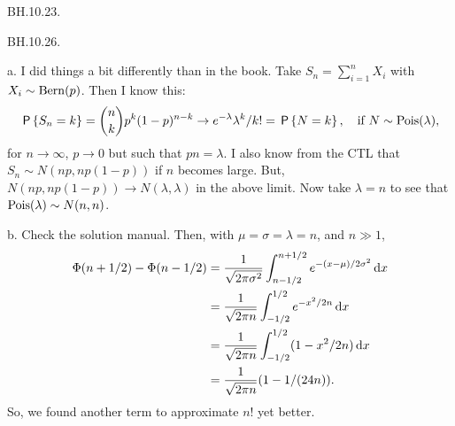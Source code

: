 \begin{exercise}
BH.10.23.
\end{exercise}

\begin{exercise}
BH.10.26.
\begin{solution}
a.
I did things a bit differently than in the book. Take $S_n=\sum_{i=1}^n X_i$ with $X_i\sim\mathrm{Bern}(p)$. Then I know this:
\begin{align*}
\,\mathsf{P}\left\{S_n=k\right\} = {n \choose k} p^k(1-p)^{n-k} \to e^{-\lambda} \lambda^k/k! = \,\mathsf{P}\left\{N=k\right\}, \quad\text{if } N\sim\mathrm{Pois}(\lambda),
\end{align*}
for $n\to \infty$, $p\to0$ but such that $p n = \lambda$.
I also know from the CTL that $S_n\sim N(n p, n p(1-p))$ if $n$ becomes large.
But, $N(n p, n p(1-p)) \to N(\lambda, \lambda)$ in the above limit.
Now take $\lambda=n$ to see that $\mathrm{Pois}(\lambda) \sim N(n,n)$.

b.
Check the solution manual. Then, with $\mu=\sigma=\lambda=n$, and $n\gg 1$,
\begin{align*}
\Phi(n+1/2) - \Phi(n-1/2)
&= \frac 1 {\sqrt{2\pi \sigma^{2}}}\int_{n-1/2}^{n+1/2} e^{-(x-\mu)/2\sigma^{2}} \,\textrm{d}x\\
&= \frac 1 {\sqrt{2\pi n }}\int_{-1/2}^{1/2} e^{-x^{2}/2n} \,\textrm{d}x\\
&= \frac 1 {\sqrt{2\pi n }}\int_{-1/2}^{1/2} (1 - x^{2}/2n) \,\textrm{d}x\\
&= \frac 1 {\sqrt{2\pi n }} (1- 1/(24 n)).
\end{align*}
So, we found another term to approximate $n!$ yet better.
\end{solution}
\end{exercise}



